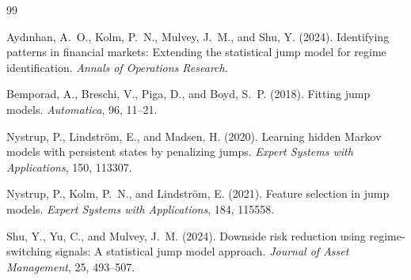 \documentclass[11pt]{article}
\begin{document}
\begin{thebibliography}{99}

Ayd{\i}nhan, A.~O., Kolm, P.~N., Mulvey, J.~M., and Shu, Y. (2024).
Identifying patterns in financial markets: Extending the statistical jump model for regime identification.
\emph{Annals of Operations Research}.

Bemporad, A., Breschi, V., Piga, D., and Boyd, S.~P. (2018).
Fitting jump models.
\emph{Automatica}, 96, 11--21.

Nystrup, P., Lindstr\"om, E., and Madsen, H. (2020).
Learning hidden Markov models with persistent states by penalizing jumps.
\emph{Expert Systems with Applications}, 150, 113307.

Nystrup, P., Kolm, P.~N., and Lindstr\"om, E. (2021).
Feature selection in jump models.
\emph{Expert Systems with Applications}, 184, 115558.

Shu, Y., Yu, C., and Mulvey, J.~M. (2024).
Downside risk reduction using regime-switching signals: A statistical jump model approach.
\emph{Journal of Asset Management}, 25, 493--507.

\end{thebibliography}
\end{document}

